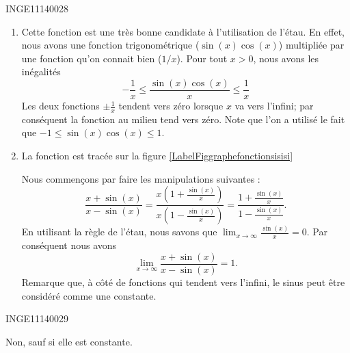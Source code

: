 \documentclass{article}
\begin{document}
\begin{corrige}{INGE11140028}

	\begin{enumerate}

		\item
			Cette fonction est une très bonne candidate à l'utilisation de l'étau. En effet, nous avons une fonction trigonométrique ($\sin(x)\cos(x)$) multipliée par une fonction qu'on connait bien ($1/x$). Pour tout $x>0$, nous avons les inégalités
			\begin{equation}
				-\frac{1}{ x }\leq\frac{ \sin(x)\cos(x) }{ x }\leq \frac{1}{ x }
			\end{equation}
			Les deux fonctions $\pm\frac{1}{ x }$ tendent vers zéro lorsque $x$ va vers l'infini; par conséquent la fonction au milieu tend vers zéro.
			Note que l'on a utilisé le fait que $-1\leq \sin(x)\cos(x)\leq 1$.

		\item \label{ItemB40028ex}

			La fonction est tracée sur la figure \ref{LabelFiggraphefonctionsisisi}
			\newcommand{\CaptionFiggraphefonctionsisisi}{Tracé de la fonction pour l'exercie \ref{exoINGE11140028}\ref{ItemB40028ex}.}
			
			Nous commençons par faire les manipulations suivantes :
			\begin{equation}
				\frac{ x+\sin(x) }{ x-\sin(x) }=\frac{ x\left( 1+\frac{ \sin(x) }{ x } \right) }{ x\left( 1-\frac{ \sin(x) }{ x } \right) }=\frac{ 1+\frac{ \sin(x) }{ x } }{ 1-\frac{ \sin(x) }{ x } }.
			\end{equation}
			En utilisant la règle de l'étau, nous savons que $\lim_{x\to \infty} \frac{ \sin(x) }{ x }=0$. Par conséquent nous avons
			\begin{equation}
				\lim_{x\to \infty} \frac{ x+\sin(x) }{ x-\sin(x) }=1.
			\end{equation}
			Remarque que, à côté de fonctions qui tendent vers l'infini, le sinus peut être considéré comme une constante.

	\end{enumerate}

\end{corrige}


\begin{corrige}{INGE11140029}

	Non, sauf si elle est constante.

\end{corrige}
\end{document}
